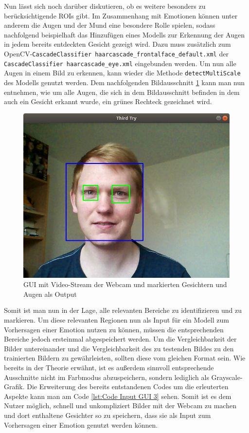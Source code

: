 \documentclass[12pt, a4paper]{report}
\begin{document}
Nun lässt sich noch darüber diskutieren, ob es weitere besonders zu berücksichtigende ROIs gibt. Im Zusammenhang mit Emotionen können unter anderem die Augen und der Mund eine besondere Rolle spielen, sodass nachfolgend beispielhaft das Hinzufügen eines Modells zur Erkennung der Augen in jedem bereits entdeckten Gesicht gezeigt wird. Dazu muss zusätzlich zum OpenCV-\texttt{CascadeClassifier haarcascade\_frontalface\_default.xml} der \texttt{CascadeClassifier haarcascade\_eye.xml} eingebunden werden. Um nun alle Augen in einem Bild zu erkennen, kann wieder die Methode \texttt{detectMultiScale} des Modells genutzt werden. Dem nachfolgenden Bildausschnitt \ref{fig:Input GUI 3} kann man nun entnehmen, wie um alle Augen, die sich in dem Bildausschnitt befinden in dem auch ein Gesicht erkannt wurde, ein grünes Rechteck gezeichnet wird.
\begin{figure}[h]
  \includegraphics[width=\linewidth]{Bilder/InputGUI3.png}
  \caption{GUI mit Video-Stream der Webcam und markierten Gesichtern und Augen als Output}
  \label{fig:Input GUI 3}
\end{figure}
Somit ist man nun in der Lage, alle relevanten Bereiche zu identifizieren und zu markieren. Um diese relevanten Regionen nun als Input für ein Modell zum Vorhersagen einer Emotion nutzen zu können, müssen die entsprechenden Bereiche jedoch ersteinmal abgespeichert werden. Um die Vergleichbarkeit der Bilder untereinander und die Vergleichbarkeit des zu testenden Bildes zu den trainierten Bildern zu gewährleisten, sollten diese vom gleichen Format sein. Wie bereits in der Theorie erwähnt, ist es außerdem sinnvoll entsprechende Ausschnitte nicht im Farbmodus abzuspeichern, sondern lediglich als Grayscale-Grafik. Die Erweiterung des bereits entstandenen Codes um die erleuterten Aspekte kann man am Code \ref{lst:Code Input GUI 3} sehen. Somit ist es dem Nutzer möglich, schnell und unkompliziert Bilder mit der Webcam zu machen und dort enthaltene Gesichter so zu speichern, dass sie als Input zum Vorhersagen einer Emotion genutzt werden können.
\end{document}
